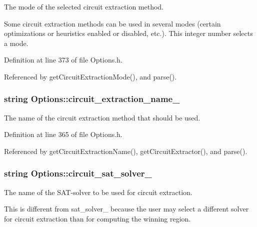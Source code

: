 The mode of the selected circuit extraction method. 

Some circuit extraction methods can be used in several modes (certain optimizations or heuristics enabled or disabled, etc.). This integer number selects a mode. 

Definition at line 373 of file Options.\-h.



Referenced by get\-Circuit\-Extraction\-Mode(), and parse().

\hypertarget{classOptions_a08739163aad2d558d5a96f1f27f4f7d8}{
\subsubsection[{circuit\-\_\-extraction\-\_\-name\-\_\-}]{\setlength{\rightskip}{0pt plus 5cm}string Options\-::circuit\-\_\-extraction\-\_\-name\-\_\-\hspace{0.3cm}{\ttfamily [protected]}}}\label{classOptions_a08739163aad2d558d5a96f1f27f4f7d8}


The name of the circuit extraction method that should be used. 



Definition at line 365 of file Options.\-h.



Referenced by get\-Circuit\-Extraction\-Name(), get\-Circuit\-Extractor(), and parse().

\hypertarget{classOptions_a1dc174bd99373a624a4643fd44225129}{
\subsubsection[{circuit\-\_\-sat\-\_\-solver\-\_\-}]{\setlength{\rightskip}{0pt plus 5cm}string Options\-::circuit\-\_\-sat\-\_\-solver\-\_\-\hspace{0.3cm}{\ttfamily [protected]}}}\label{classOptions_a1dc174bd99373a624a4643fd44225129}


The name of the S\-A\-T-\/solver to be used for circuit extraction. 

This is different from sat\-\_\-solver\-\_\- because the user may select a different solver for circuit extraction than for computing the winning region. 

